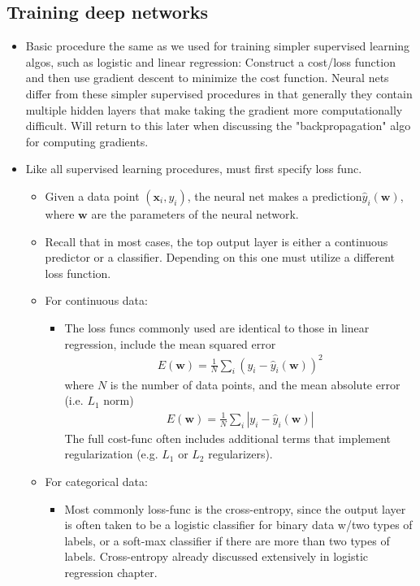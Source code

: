 \documentclass[norsk,a4paper,11pt]{article}
\begin{document}
\subsection{Training deep networks}
\begin{itemize}
	\item Basic procedure the same as we used for training simpler supervised learning algos, such as logistic and linear regression: Construct a cost/loss function and then use gradient descent to minimize the cost function. Neural nets differ from these simpler supervised procedures in that generally they contain multiple hidden layers that make taking the gradient more computationally difficult. Will return to this later when discussing the "backpropagation" algo for computing gradients.
	\item Like all supervised learning procedures, must first specify loss func.
	\begin{itemize}
		\item Given a data point $(\bm{x}_i, y_i)$, the neural net makes a prediction$\hat{y}_i (\bm{w})$, where $\bm{w}$ are the parameters of the neural network.
		\item Recall that in most cases, the top output layer is either a continuous predictor or a classifier. Depending on this one must utilize a different loss function.
		\item For continuous data:
		\begin{itemize}
			\item The loss funcs commonly used are identical to those in linear regression, include the mean squared error
			\begin{align}
				E(\bm{w}) = \frac{1}{N} \sum_i (y_i - \hat{y}_i (\bm{w}))^2
			\end{align}
			where $N$ is the number of data points, and the mean absolute error (i.e. $L_1$ norm)
			\begin{align}
				E(\bm{w}) = \frac{1}{N} \sum_i |y_i - \hat{y}_i (\bm{w})|
			\end{align}
			The full cost-func often includes additional terms that implement regularization (e.g. $L_1$ or $L_2$ regularizers).
		\end{itemize}
		\item For categorical data:
		\begin{itemize}
			\item Most commonly loss-func is the cross-entropy, since the output layer is often taken to be a logistic classifier for binary data w/two types of labels, or a soft-max classifier if there are more than two types of labels. Cross-entropy already discussed extensively in logistic regression chapter.

\end{itemize}
\end{itemize}
\end{itemize}
\end{document}
